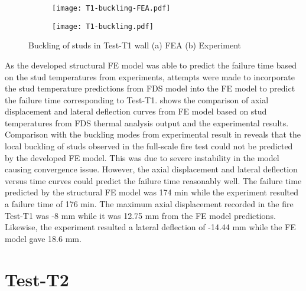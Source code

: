 \begin{figure}[!htbp]
	\centering
	\begin{subfigure}[b]{0.8\textwidth}
		\centering
		\texttt{[image: T1-buckling-FEA.pdf]}
		\caption{}
		\label{subfig:T1-buckling-FEA}
	\end{subfigure}
	\begin{subfigure}[b]{0.4\textwidth}
		\centering
		\texttt{[image: T1-buckling.pdf]}
		\caption{}
		\label{subfig:T1-buckling-FEA-Exp}
	\end{subfigure}
	   \caption{Buckling of studs in Test-T1 wall (a) FEA (b) Experiment}
	   \label{fig:T1-buckling-FE-vs-Exp}
\end{figure} 

As the developed structural FE model was able to predict the failure time based on the stud temperatures from experiments, attempts were made to incorporate the stud temperature predictions from FDS model into the FE model to predict the failure time corresponding to Test-T1.  shows the comparison of axial displacement and lateral deflection curves from FE model based on stud temperatures from FDS thermal analysis output and the experimental results. Comparison with the buckling modes from experimental result in  reveals that the local buckling of studs observed in the full-scale fire test could not be predicted by the developed FE model. This was due to severe instability in the model causing convergence issue. However, the axial displacement and lateral deflection versus time curves could predict the failure time reasonably well. The failure time predicted by the structural FE model was 174 min while the experiment resulted a failure time of 176 min. The maximum axial displacement recorded in the fire Test-T1 was -8 mm while it was 12.75 mm from the FE model predictions. Likewise, the experiment resulted a lateral deflection of -14.44 mm while the FE model gave 18.6 mm.   

\section*{Test-T2}

